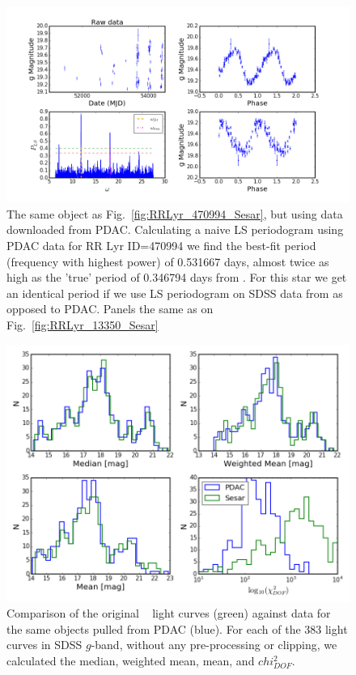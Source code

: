\documentclass[DM,lsstdraft,toc]{lsstdoc}
\begin{document}
\begin{figure}
\includegraphics[width=\textwidth]{figs/Fig_2_RRLyr_LS_periodogram_ID_470994_gPDAC}
\caption{ The same object as Fig.~\ref{fig:RRLyr_470994_Sesar}, but using data downloaded from PDAC. Calculating a naive LS periodogram using PDAC data for RR Lyr ID=470994 we find the  best-fit period (frequency with highest power) of 0.531667  days, almost twice as high as the 'true'  period of 0.346794 days from  \citep{2010ApJ...708..717S}. For this star we get an identical period if we use LS periodogram on SDSS data from \citep{2010ApJ...708..717S} as opposed to PDAC. Panels the same as on Fig.~\ref{fig:RRLyr_13350_Sesar}}
\label{fig:RRLyr_470994_PDAC}
\end{figure}


\begin{figure}
\includegraphics[width=\columnwidth]{figs/Fig_PDAC_sesar_compare}
\caption{Comparison of the original ~\citep{2010ApJ...708..717S}  light curves (green) against data for the same objects  pulled from PDAC (blue). For each of the 383 light curves in SDSS $g$-band, without any pre-processing or clipping, we calculated the median, weighted mean, mean, and $chi^{2}_{DOF}$. }
\label{fig:PDAC_SDSS_comp}
\end{figure}
\end{document}
